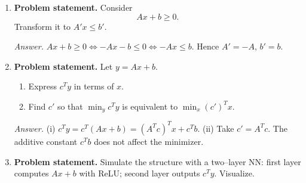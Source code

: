 \documentclass[11pt]{article}
\begin{document}
\begin{enumerate}[label=\textbf{3(\alph*)}]
	
	\item \textbf{Problem statement.}
	Consider
	\begin{equation}
		Ax + b \ge 0. \tag{12}
	\end{equation}
	Transform it to $A'x \le b'$.
	
	\emph{Answer.}
	$Ax+b\ge 0 \iff -Ax-b\le 0 \iff -Ax\le b$.
	Hence $A'=-A$, $b'=b$.
	
	\item \textbf{Problem statement.}
	Let $y=Ax+b$.
	\begin{enumerate}[label=\roman*)]
		\item Express $c^T y$ in terms of $x$.
		\item Find $c'$ so that $\min_y c^T y$ is equivalent to $\min_x (c')^T x$.
	\end{enumerate}
	
	\emph{Answer.}
	(i) $c^T y = c^T(Ax+b)=(A^T c)^T x + c^T b$. \;
	(ii) Take $c'=A^T c$. The additive constant $c^T b$ does not affect the minimizer.
	
	\item \textbf{Problem statement.}
	Simulate the structure with a two–layer NN: first layer computes $Ax+b$ with ReLU; second layer outputs $c^T y$. Visualize.
	

\end{enumerate}
\end{document}
